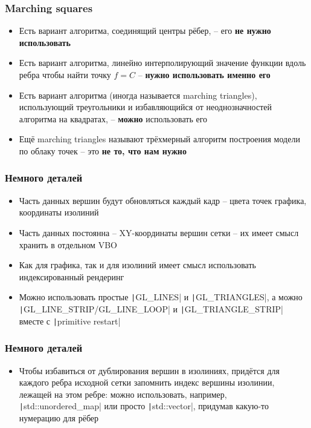 \documentclass[10pt]{beamer}
\begin{document}
\begin{frame}[fragile]
\frametitle{Marching squares}
\begin{itemize}
\item Есть вариант алгоритма, соединящий центры рёбер, -- его \textbf{\alert{не нужно использовать}}
\item Есть вариант алгоритма, линейно интерполирующий значение функции вдоль ребра чтобы найти точку \begin{math}f = C\end{math} -- \textbf{\alert{нужно использовать именно его}}
\pause
\item Есть вариант алгоритма (иногда называется marching triangles), использующий треугольники и избавляющийся от неоднозначностей алгоритма на квадратах, -- \textbf{\alert{можно}} использовать его
\pause
\item Ещё marching triangles называют трёхмерный алгоритм построения модели по облаку точек -- это \textbf{\alert{не то, что нам нужно}}
\end{itemize}
\end{frame}

\begin{frame}[fragile]
\frametitle{Немного деталей}
\begin{itemize}
\item Часть данных вершин будут обновляться каждый кадр -- цвета точек графика, координаты изолиний
\item Часть данных постоянна -- XY-координаты вершин сетки -- их имеет смысл хранить в отдельном VBO
\item Как для графика, так и для изолиний имеет смысл использовать индексированный рендеринг
\item Можно использовать простые \texttt|GL_LINES| и \texttt|GL_TRIANGLES|, а можно \texttt|GL_LINE_STRIP/GL_LINE_LOOP| и \texttt|GL_TRIANGLE_STRIP| вместе с \texttt|primitive restart|
\end{itemize}
\end{frame}

\begin{frame}[fragile]
\frametitle{Немного деталей}
\begin{itemize}
\item Чтобы избавиться от дублирования вершин в изолиниях, придётся для каждого ребра исходной сетки запомнить индекс вершины изолинии, лежащей на этом ребре: можно использовать, например, \texttt|std::unordered_map| или просто \texttt|std::vector|, придумав какую-то нумерацию для рёбер
\end{itemize}
\end{frame}
\end{document}
